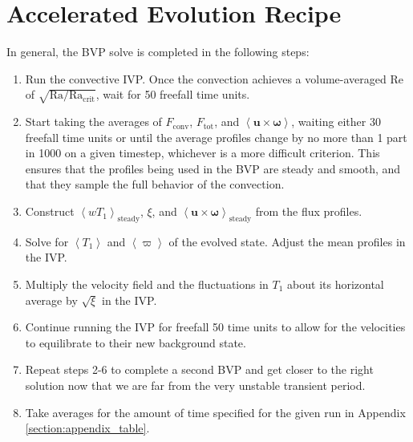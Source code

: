 \documentclass[aps, pre, onecolumn, nofootinbib, notitlepage, groupedaddress, amsfonts, amssymb, amsmath, longbibliography]{revtex4-1}
\newcommand{\angles}[1]{\ensuremath{\left\langle #1 \right\rangle}}
\begin{document}
\section{Accelerated Evolution Recipe}
\label{appendix:recipe}
In general, the BVP solve is completed in the following steps:
\begin{enumerate}
\item Run the convective IVP. Once the convection achieves a volume-averaged Re of $\sqrt{\text{Ra}/\text{Ra}_{\text{crit}}}$,
wait for 50 freefall time units.  
\item Start taking the averages of $F_{\text{conv}}$, $F_{\text{tot}}$, and $\angles{\bm{u} \times \bm{\omega}}$, waiting either
30 freefall time units or until the average profiles change by no more than 1 part in 1000 on a
given timestep, whichever is a more difficult criterion. This ensures that
the profiles being used in the BVP are steady and smooth, and that they sample the full behavior of the convection.
\item Construct $\angles{w T_1}_{\text{steady}}$, $\xi$, and $\angles{\bm{u}\times\bm{\omega}}_{\text{steady}}$
from the flux profiles.
\item Solve for $\angles{T_1}$ and \angles{\varpi} of the
evolved state.  Adjust the mean profiles in the IVP.
\item Multiply the velocity field and the fluctuations in $T_1$ about its horizontal average by $\sqrt{\xi}$ in the IVP. 
\item Continue running the IVP for freefall 50 time units to allow for the velocities to equilibrate to their new background state.
\item Repeat steps 2-6 to complete a second BVP and get closer to the right solution now that we
are far from the very unstable transient period.
\item Take averages for the amount of time specified for the given run in Appendix \ref{section:appendix_table}.
\end{enumerate}





\end{document}
